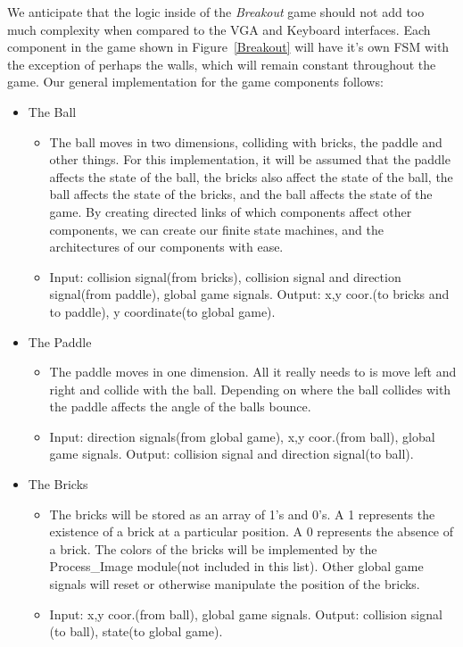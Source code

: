 \documentclass[conference]{IEEEtran}
\begin{document}
We anticipate that the logic inside of the \emph{Breakout} game should not add too much complexity when compared to the VGA and Keyboard interfaces. Each component in the game shown in Figure~\ref{Breakout} will have it's own FSM with the exception of perhaps the walls, which will remain constant throughout the game. Our general implementation for the game components follows:
\begin{itemize}
\item The Ball
\begin{itemize}
\item The ball moves in two dimensions, colliding with bricks, the paddle and other things. For this implementation, it will be assumed that the paddle affects the state of the ball, the bricks also affect the state of the ball, the ball affects the state of the bricks, and the ball affects the state of the game. By creating directed links of which components affect other components, we can create our finite state machines, and the architectures of our components with ease.
\item Input: collision signal(from bricks), collision signal and direction signal(from paddle), global game signals. Output: x,y coor.(to bricks and to paddle), y coordinate(to global game).
\end{itemize}
\item The Paddle
\begin{itemize}
\item The paddle moves in one dimension. All it really needs to is move left and right and collide with the ball. Depending on where the ball collides with the paddle affects the angle of the balls bounce. 
\item Input: direction signals(from global game), x,y coor.(from ball), global game signals. Output: collision signal and direction signal(to ball).
\end{itemize}
\item The Bricks 
\begin{itemize}
\item The bricks will be stored as an array of 1's and 0's. A 1 represents the existence of a brick at a particular position. A 0 represents the absence of a brick. The colors of the bricks will be implemented by the Process\_Image module(not included in this list). Other global game signals will reset or otherwise manipulate the position of the bricks.
\item Input: x,y coor.(from ball), global game signals. Output: collision signal (to ball), state(to global game).
\end{itemize}
\end{itemize}
\end{document}
